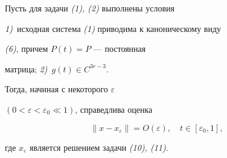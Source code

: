 \begin{thmnonum} Пусть для задачи {\em (1), (2)} выполнены условия


{\em 1)}~исходная система {\em (1)} приводима к каноническому виду


{\em (6)}, причем $P(t)=P$ --- постоянная


матрица; {\em 2)}~$g(t)\in C^{3r-3}$.





Тогда, начиная с некоторого $\varepsilon$


$(0<\varepsilon<\varepsilon_0\ll 1)$, справедлива оценка


$$


\|x-x_\varepsilon\|=O(\varepsilon),\quad t\in[\varepsilon_0,1],


$$


где $x_\varepsilon$ является решением задачи {\em (10), (11)}.


\end{thmnonum}






